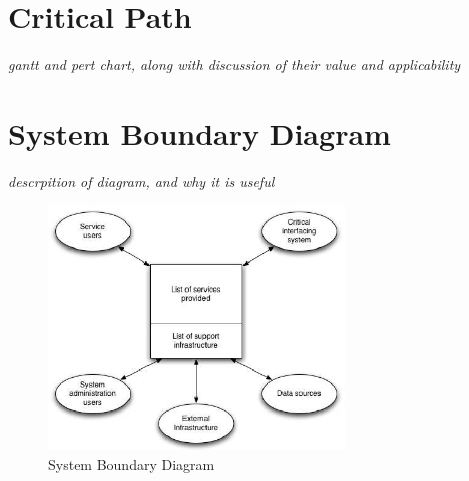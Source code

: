 \section{Critical Path}
\textit{gantt and pert chart, along with discussion of their value and
applicability}

\section{System Boundary Diagram}
\textit{descrpition of diagram, and why it is useful}
\begin{figure}[h]
    \centering
    \includegraphics[width=0.7\textwidth]{images/requirements/system_boundary_diagram.png}
    \caption{System Boundary Diagram}
    \label{fig:sys_boundary_diag}
\end{figure}
